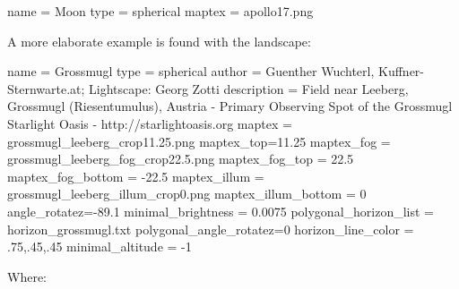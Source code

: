 \begin{configfile}
[landscape]
name = Moon
type = spherical
maptex = apollo17.png
\end{configfile}
A more elaborate example is found with the  landscape:

\begin{configfile}
[landscape]
name = Grossmugl
type = spherical
author = Guenther Wuchterl, Kuffner-Sternwarte.at;
         Lightscape: Georg Zotti
description = Field near Leeberg, Grossmugl (Riesentumulus),
              Austria - Primary Observing Spot of the Grossmugl
              Starlight Oasis - http://starlightoasis.org
maptex = grossmugl_leeberg_crop11.25.png
maptex_top=11.25
maptex_fog = grossmugl_leeberg_fog_crop22.5.png
maptex_fog_top = 22.5
maptex_fog_bottom = -22.5
maptex_illum = grossmugl_leeberg_illum_crop0.png
maptex_illum_bottom = 0
angle_rotatez=-89.1
minimal_brightness = 0.0075
polygonal_horizon_list = horizon_grossmugl.txt
polygonal_angle_rotatez=0
horizon_line_color =  .75,.45,.45
minimal_altitude = -1
\end{configfile}
Where:
